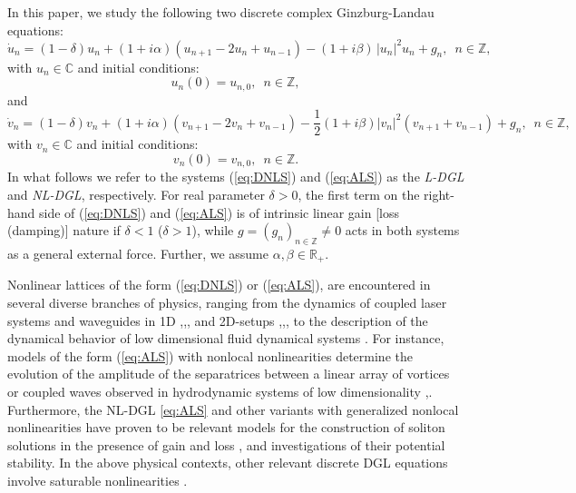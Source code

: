 \documentclass[preprintnumbers,amsmath,amssymb]{revtex4}
\begin{document}
\noindent 
In this paper, we study the following two discrete complex Ginzburg-Landau equations: 
\begin{equation}
\dot{u}_n=(1-\delta)u_n+(1+i\alpha)
(u_{n+1}-2u_n+u_{n-1})-(1+i\beta)\,|u_{n}|^2u_n+g_n,\,\,\,n\in {\mathbb{Z}},\label{eq:DNLS}
\end{equation}
with $u_n \in {\mathbb{C}}$ and initial conditions:
\begin{equation}
 u_{n}(0)=u_{n,0},\,\,\,n \in {\mathbb{Z}},\label{eq:icsDNLS}
\end{equation}
and 
\begin{equation}
\dot{v}_n=(1-\delta)v_n+(1+i\alpha)(v_{n+1}-2v_n+v_{n-1})-\frac{1}{2}(1+i\beta)|v_n|^2(v_{n+1}+v_{n-1}) +g_n,\,\,\,n\in {\mathbb{Z}},\label{eq:ALS}
\end{equation}
with $v_n \in {\mathbb{C}}$ and initial conditions:
\begin{equation}
 v_{n}(0)=v_{n,0},\,\,\,n \in {\mathbb{Z}}.\label{eq:icsALS}
\end{equation}
In what follows we refer to the systems (\ref{eq:DNLS}) and (\ref{eq:ALS}) as the {\it L-DGL} and {\it NL-DGL}, respectively. For real parameter $\delta >0$, the first term on the right-hand side of (\ref{eq:DNLS}) and (\ref{eq:ALS}) is of  intrinsic linear gain [loss (damping)] nature if $\delta<1$ ($\delta>1$), while $g=(g_n)_{n\in {\mathbb{Z}}}\neq 0$ acts in both systems as a general external force. Further, we assume $\alpha,\beta \in {\mathbb{R}}_+$. 

Nonlinear lattices of the form (\ref{eq:DNLS}) or (\ref{eq:ALS}), are encountered in several diverse branches of physics, ranging from the dynamics of coupled laser systems and waveguides in 1D \cite{UGL1},\cite{UGL2},\cite{BUGL2},  and 2D-setups \cite{UGL3},\cite{UGL4},\cite{BUGL4}, to the description of the dynamical behavior of low dimensional fluid dynamical systems \cite{UGL5}. For instance, models of the form (\ref{eq:ALS}) with nonlocal nonlinearities determine the evolution of the amplitude of the separatrices between a linear array of vortices or coupled waves observed in hydrodynamic systems of low dimensionality \cite{AGL1},\cite{AGL2}.  Furthermore, the NL-DGL \eqref{eq:ALS}  and other variants with generalized nonlocal nonlinearities have proven to be relevant models for the construction of soliton solutions in the presence of gain and loss \cite{AGL3},\cite{AGL4} and investigations of their potential stability. In the above physical contexts, other relevant discrete DGL equations involve saturable nonlinearities \cite{UGL6}. 
\end{document}
